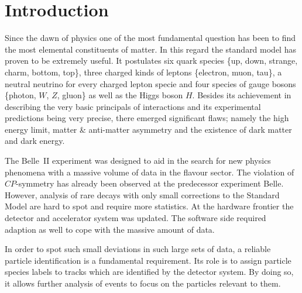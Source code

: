\chapter{Introduction}
\label{chap:introduction}

Since the dawn of physics one of the most fundamental question has been to find the most elemental constituents of matter. In this regard the standard model has proven to be extremely useful. It postulates six quark species \{up, down, strange, charm, bottom, top\}, three charged kinds of leptons \{electron, muon, tau\}, a neutral neutrino for every charged lepton specie and four species of gauge bosons \{photon, $W$, $Z$, gluon\} as well as the Higgs boson $H$. Besides its achievement in describing the very basic principals of interactions and its experimental predictions being very precise, there emerged significant flaws; namely the high energy limit, matter \& anti-matter asymmetry and the existence of dark matter and dark energy.

The Belle~\RN{2} experiment was designed to aid in the search for new physics phenomena with a massive volume of data in the flavour sector. The violation of $CP$-symmetry has already been observed at the predecessor experiment Belle. However, analysis of rare decays with only small corrections to the Standard Model are hard to spot and require more statistics. At the hardware frontier the detector and accelerator system was updated. The software side required adaption as well to cope with the massive amount of data.

In order to spot such small deviations in such large sets of data, a reliable particle identification is a fundamental requirement. Its role is to assign particle species labels to tracks which are identified by the detector system. By doing so, it allows further analysis of events to focus on the particles relevant to them.
